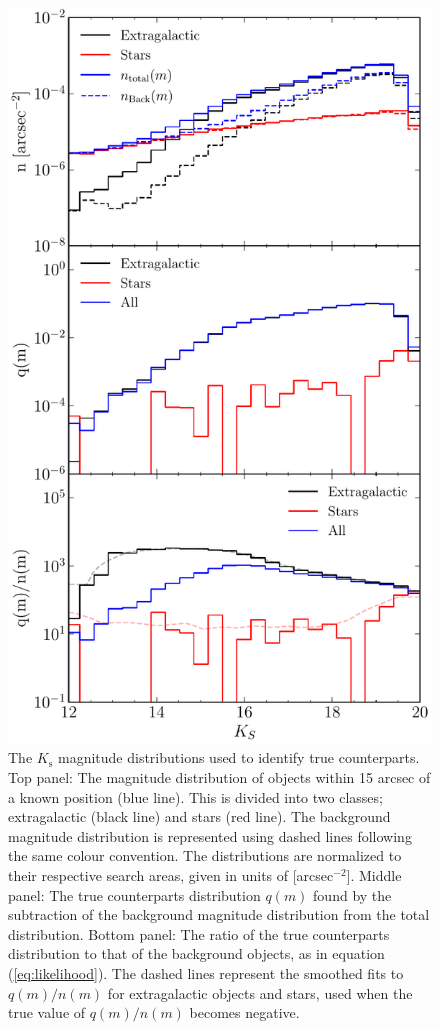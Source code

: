 \documentclass[fleqn,usenatbib]{mnras}
\begin{document}
\begin{figure}
	\includegraphics[width=\columnwidth]{Fig_2}
    \caption{The $K_\textrm{s}$ magnitude distributions used to identify true counterparts. Top panel: The magnitude distribution of objects within 15 arcsec of a known position (blue line). This is divided into two classes; extragalactic (black line) and stars (red line). The background magnitude distribution is represented using dashed lines following the same colour convention. The distributions are normalized to their respective search areas, given in units of [arcsec$^{-2}$]. Middle panel: The true counterparts distribution $q(m)$ found by the subtraction of the background magnitude distribution from the total distribution. Bottom panel: The ratio of the true counterparts distribution to that of the background objects, as in equation (\ref{eq:likelihood}). The dashed lines represent the smoothed fits to $q(m)/n(m)$ for extragalactic objects and stars, used when the true value of $q(m)/n(m)$ becomes negative.}
    \label{fig:q_n_distributions}
\end{figure}
\end{document}
